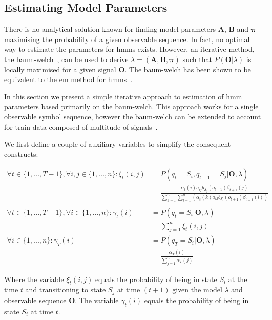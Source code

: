 \subsection{Estimating Model Parameters}
\label{sec:baum-welch}
There is no analytical solution known for finding model parameters $\mathbf{A}$, $\mathbf{B}$ and $\boldsymbol{\pi}$ maximising the probability of a given observable sequence. In fact, no optimal way to estimate the parameters for \glspl{hmm} exists. However, an iterative method, the \gls{baum-welch}~\cite{baum1970}, can be used to derive $\lambda = (\mathbf{A}, \mathbf{B}, \boldsymbol{\pi})$ such that $P(\mathbf{O}|\lambda)$ is locally maximised for a given signal $\mathbf{O}$. The \gls{baum-welch} has been shown to be equivalent to the \gls{em} method for \glspl{hmm}~\cite{Dempster1977, wu1983}.

In this section we present a simple iterative approach to estimation of \gls{hmm} parameters based primarily on the \gls{baum-welch}. This approach works for a single observable symbol sequence, however the \gls{baum-welch} can be extended to account for train data composed of multitude of signals~\cite{Rabiner89hmm, levinson1983, li2000}.

We first define a couple of auxiliary variables to simplify the consequent constructs:

\begin{align*}
\forall t\in\{1,...,T-1\},\forall i,j\in \{1,...,n\}: \xi_t(i,j) &= P(q_t =S_i, q_{t+1}=S_j|\mathbf{O},\lambda)\\
&= \frac{\alpha_t(i)a_{ij}b_{S_j}(o_{t+1})\beta_{t+1}(j)}{\sum_{k=1}^n\sum_{l=1}^n(\alpha_t(k)a_{kl}b_{S_l}(o_{t+1})\beta_{t+1}(l))}\\
\\
\forall t\in\{1,...,T-1\},\forall i\in\{1,...,n\}: \gamma_t(i) &=P(q_t=S_i|\mathbf{O},\lambda)\\
&=\sum_{j=1}^n\xi_t(i,j)\\
\forall i\in\{1,...,n\}: \gamma_T(i) &= P(q_T=S_i|\mathbf{O},\lambda)\\
&= \frac{\alpha_T(i)}{\sum_{j=1}^n\alpha_T(j)}
\end{align*}

Where the variable $\xi_t(i,j)$ equals the probability of being in state $S_i$ at the time $t$ and transitioning to state $S_j$ at time $(t+1)$ given the model $\lambda$ and observable sequence $\mathbf{O}$. The variable $\gamma_t(i)$ equals the probability of being in state $S_i$ at time $t$.

